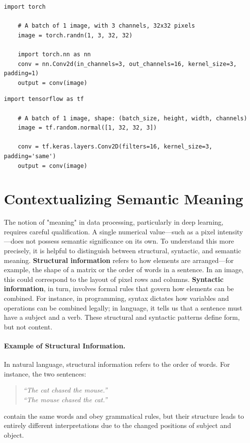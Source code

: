 \begin{lstlisting}[caption=Creating and passing an image through a Conv2d layer in PyTorch]
	import torch
	
	# A batch of 1 image, with 3 channels, 32x32 pixels
	image = torch.randn(1, 3, 32, 32)
	
	import torch.nn as nn
	conv = nn.Conv2d(in_channels=3, out_channels=16, kernel_size=3, padding=1)
	output = conv(image)
\end{lstlisting}

\begin{lstlisting}[caption=Creating and passing an image through a Conv2D layer in TensorFlow]
	import tensorflow as tf
	
	# A batch of 1 image, shape: (batch_size, height, width, channels)
	image = tf.random.normal([1, 32, 32, 3])
	
	conv = tf.keras.layers.Conv2D(filters=16, kernel_size=3, padding='same')
	output = conv(image)
\end{lstlisting}


\section{Contextualizing Semantic Meaning}

The notion of "meaning" in data processing, particularly in deep learning, requires careful qualification. A single numerical value—such as a pixel intensity—does not possess semantic significance on its own. To understand this more precisely, it is helpful to distinguish between structural, syntactic, and semantic meaning. \textbf{Structural information} refers to how elements are arranged—for example, the shape of a matrix or the order of words in a sentence. In an image, this could correspond to the layout of pixel rows and columns. \textbf{Syntactic information}, in turn, involves formal rules that govern how elements can be combined. For instance, in programming, syntax dictates how variables and operations can be combined legally; in language, it tells us that a sentence must have a subject and a verb. These structural and syntactic patterns define form, but not content.

\paragraph{Example of Structural Information.}
In natural language, structural information refers to the order of words. For instance, the two sentences:
\begin{quote}
	\textit{``The cat chased the mouse.''} \\
	\textit{``The mouse chased the cat.''}
\end{quote}
contain the same words and obey grammatical rules, but their structure leads to entirely different interpretations due to the changed positions of subject and object.

